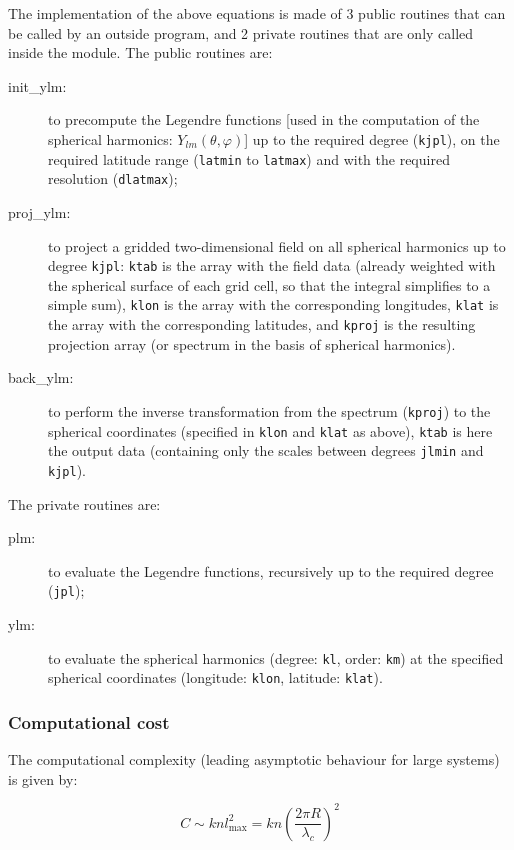 \documentclass[11pt]{article}
\begin{document}
The implementation of the above equations
is made of 3 public routines that can be called
by an outside program, and 2 private routines that are only called
inside the module.
The public routines are:
\begin{description}
\item[init\_ylm:] to precompute the Legendre functions
  [used in the computation of the spherical harmonics: $Y_{lm}(\theta,\varphi)$]
  up to the required degree ({\tt kjpl}),
  on the required latitude range ({\tt latmin} to {\tt latmax})
  and with the required resolution ({\tt dlatmax});
\item[proj\_ylm:] to project a gridded two-dimensional field
  on all spherical harmonics up to degree {\tt kjpl}:
  {\tt ktab} is the array with the field data (already weighted
              with the spherical surface of each grid cell,
              so that the integral simplifies to a simple sum),
  {\tt klon} is the array with the corresponding longitudes,
  {\tt klat} is the array with the corresponding latitudes, and
  {\tt kproj} is the resulting projection array (or spectrum
              in the basis of spherical harmonics).
\item[back\_ylm:] to perform the inverse transformation from the
              spectrum ({\tt kproj}) to the spherical coordinates
              (specified in {\tt klon} and {\tt klat} as above),
              {\tt ktab} is here the output data
              (containing only the scales between degrees
              {\tt jlmin} and {\tt kjpl}).
\end{description}
The private routines are:
\begin{description}
\item[plm:] to evaluate the Legendre functions, recursively
            up to the required degree ({\tt jpl});
\item[ylm:] to evaluate the spherical harmonics
            (degree: {\tt kl}, order: {\tt km})
            at the specified spherical coordinates
            (longitude: {\tt klon}, latitude: {\tt klat}).
\end{description}

\subsubsection*{Computational cost}

The computational complexity (leading asymptotic behaviour for large systems)
is given by:

\begin{equation}
C \sim k n  l_{\max}^2 = k n \left( \frac{2\pi R}{\lambda_c} \right)^2
\end{equation}
\end{document}
